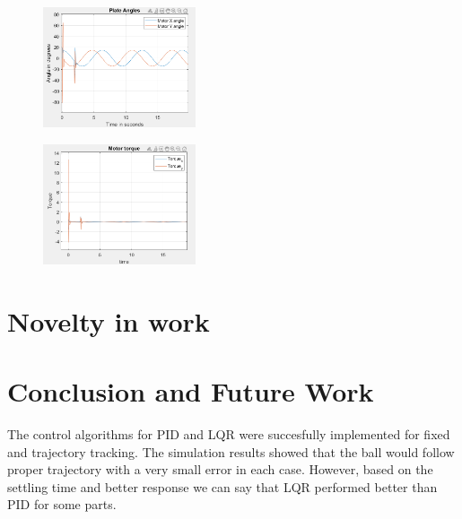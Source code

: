 \documentclass[conference]{IEEEtran}
\begin{document}
\begin{figure}[htbp]
\centerline{\includegraphics[width=0.4\textwidth]{DRCPALQR.png}}
\caption{}
\label{fig}
\end{figure}
\begin{figure}[htbp]
\centerline{\includegraphics[width=0.4\textwidth]{DRCMTLQR.png}}
\caption{}
\label{fig}
\end{figure}


\section{Novelty in work}

\section{Conclusion and Future Work}
The control algorithms for PID and LQR were succesfully implemented for fixed and trajectory tracking. The simulation results showed that the ball would follow proper trajectory with a very small error in each case. However, based on the settling time and better response we can say that LQR performed better than PID for some parts. 
\end{document}

